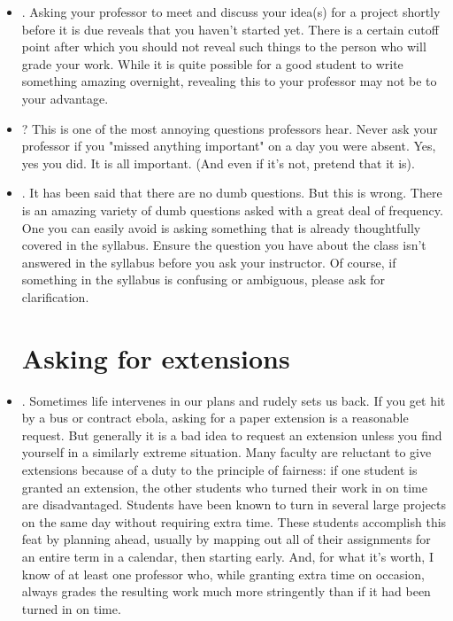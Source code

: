 \begin{itemize}

\item {}. Asking your professor to meet and discuss your idea(s) for a project shortly before it is due reveals that you haven't started yet. There is a certain cutoff point after which you should not reveal such things to the person who will grade your work. While it is quite possible for a good student to write something amazing overnight, revealing this to your professor may not be to your advantage. 

\item {}? This is one of the most annoying questions professors hear. Never ask your professor if you "missed anything important" on a day you were absent. Yes, yes you did. It is all important. (And even if it's not, pretend that it is).

\item {}. It has been said that there are no dumb questions. But this is wrong. There is an amazing variety of dumb questions asked with a great deal of frequency. One you can easily avoid is asking something that is already thoughtfully covered in the syllabus. Ensure the question you have about the class isn't answered in the syllabus before you ask your instructor. Of course, if something in the syllabus is confusing or ambiguous, please ask for clarification. 

\section{Asking for extensions}

\item {}. Sometimes life intervenes in our plans and rudely sets us back. If you get hit by a bus or contract ebola, asking for a paper extension is a reasonable request. But generally it is a bad idea to request an extension unless you find yourself in a similarly extreme situation. Many faculty are reluctant to give extensions because of a duty to the principle of fairness: if one student is granted an extension, the other students who turned their work in on time are disadvantaged. Students have been known to turn in several large projects on the same day without requiring extra time. These students accomplish this feat by planning ahead, usually by mapping out all of their assignments for an entire term in a calendar, then starting early. And, for what it's worth, I know of at least one professor who, while granting extra time on occasion, always grades the resulting work much more stringently than if it had been turned in on time. 


\end{itemize}
